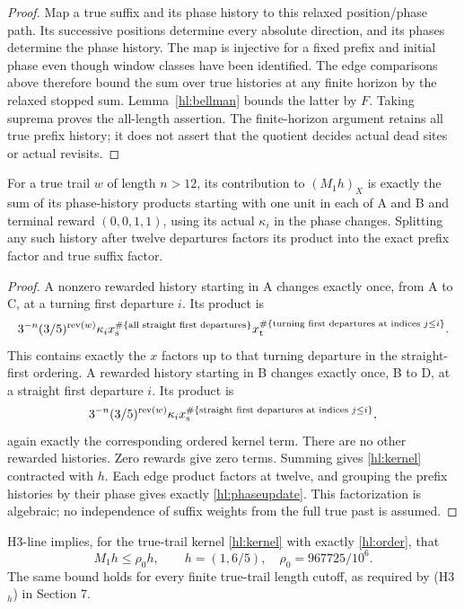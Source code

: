 \begin{proof}
Map a true suffix and its phase history to this relaxed
position/phase path.  Its successive positions determine
every absolute direction, and its phases determine the phase
history.  The map is injective for a fixed prefix and initial
phase even though window classes have been identified.  The
edge comparisons above therefore bound the sum over true
histories at any finite horizon by the relaxed stopped sum.
Lemma~\ref{hl:bellman} bounds the latter by $F$.  Taking
suprema proves the all-length assertion.  The finite-horizon
argument retains all true prefix history; it does not assert
that the quotient decides actual dead sites or actual revisits.
\end{proof}

\begin{lemma}
\label{hl:phaseidentity}
For a true trail $w$ of length $n>12$, its contribution to
$(M_1h)_X$ is exactly the sum of its phase-history products
starting with one unit in each of A and B and terminal reward
$(0,0,1,1)$, using its actual $\kappa_i$ in the phase changes.
Splitting any such history after twelve departures factors its
product into the exact prefix factor and true suffix factor.
\end{lemma}

\begin{proof}
A nonzero rewarded history starting in A changes exactly once,
from A to C, at a turning first departure $i$.  Its product is
\[
 3^{-n}(3/5)^{\operatorname{rev}(w)}\kappa_i
 x_{\rm s}^{\#\{\text{all straight first departures}\}}
 x_{\rm t}^{\#\{\text{turning first departures at indices }j\le i\}}.
\]
This contains exactly the $x$ factors up to that turning
departure in the straight-first ordering.  A rewarded history
starting in B changes exactly once, B to D, at a straight
first departure $i$.  Its product is
\[
 3^{-n}(3/5)^{\operatorname{rev}(w)}\kappa_i
 x_{\rm s}^{\#\{\text{straight first departures at indices }j\le i\}},
\]
again exactly the corresponding ordered kernel term.  There
are no other rewarded histories.  Zero rewards give zero
terms.  Summing gives \eqref{hl:kernel} contracted with $h$.
Each edge product factors at twelve, and grouping the prefix
histories by their phase gives exactly \eqref{hl:phaseupdate}.
This factorization is algebraic; no independence of suffix
weights from the full true past is assumed.
\end{proof}

\begin{theorem}\label{hl:theorem}
H3-line implies, for the true-trail kernel
\eqref{hl:kernel} with exactly \eqref{hl:order}, that
\begin{equation}\label{hl:result}
  M_1h\le\rho_0h,\qquad h=(1,6/5),\quad\rho_0=967725/10^6.
\end{equation}
The same bound holds for every finite true-trail length cutoff,
as required by (H3$_h$) in Section 7.
\end{theorem}

